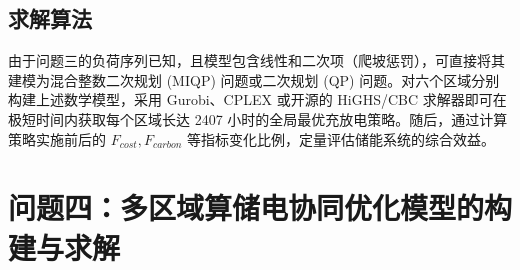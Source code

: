\documentclass[UTF8,a4paper,zihao=-4]{ctexart}
\begin{document}
\subsection{求解算法}
由于问题三的负荷序列已知，且模型包含线性和二次项（爬坡惩罚），可直接将其建模为混合整数二次规划 (MIQP) 问题或二次规划 (QP) 问题。对六个区域分别构建上述数学模型，采用 Gurobi、CPLEX 或开源的 HiGHS/CBC 求解器即可在极短时间内获取每个区域长达 2407 小时的全局最优充放电策略。随后，通过计算策略实施前后的 $F_{cost}, F_{carbon}$ 等指标变化比例，定量评估储能系统的综合效益。







































\section{问题四：多区域算储电协同优化模型的构建与求解}
\FloatBarrier
\end{document}
